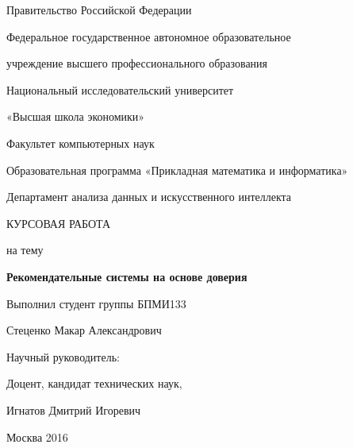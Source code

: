 \thispagestyle{empty}

\begin{center}
{\large Правительство Российской Федерации\par
Федеральное государственное автономное образовательное\par
учреждение высшего профессионального образования\par}
{\Large Национальный исследовательский университет\par
«Высшая школа экономики»\par}
\end{center}

\vspace{5mm}

\begin{center}
{\large Факультет компьютерных наук\par
Образовательная программа «Прикладная математика и информатика»\par 
Департамент анализа данных и искусственного интеллекта\par
\par}
\end{center}

\vspace{30mm}

\begin{center}
{\Large КУРСОВАЯ РАБОТА}\par
{\large на тему\par}
\textbf{\Large Рекомендательные системы на основе доверия}
\end{center}

\vspace{30mm}
\begin{flushright}
{\large Выполнил студент группы БПМИ133\par
Стеценко Макар Александрович\par
\par
\vspace{5mm}
Научный руководитель:\par
Доцент, кандидат технических наук,\par Игнатов Дмитрий Игоревич\par}
\end{flushright}

\vspace{30mm}
\begin{center}
{\large Москва 2016}
\end{center}

\newpage